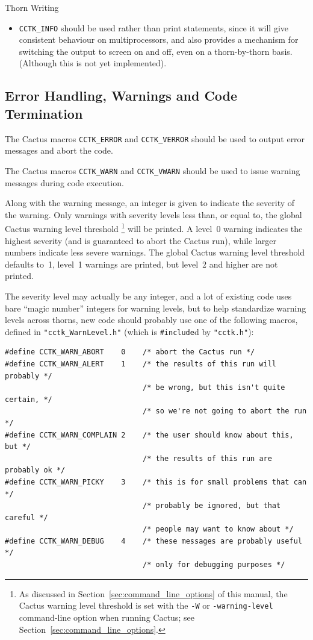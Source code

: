 \begin{cactuspart}{Thorn Writing}
\begin{itemize}
\item{} \texttt{CCTK\_INFO} should be used rather than print statements,
       since it will give consistent behaviour on multiprocessors, and
       also provides a mechanism for switching the output to screen on
       and off, even on a thorn-by-thorn basis. (Although this is
       not yet implemented).
\end{itemize}


\subsection{Error Handling, Warnings and Code Termination}
\label{sec:erhawancote}
The Cactus macros \texttt{CCTK\_ERROR} and
\texttt{CCTK\_VERROR} should be used to output error messages
and abort the code.

The Cactus macros \texttt{CCTK\_WARN} and
\texttt{CCTK\_VWARN} should be used to issue warning messages
during code execution.

Along with the warning message, an integer is given to indicate the
severity of the warning.  Only warnings with severity levels less
than, or equal to, the global Cactus warning level threshold%
\footnote{%
         As discussed in Section~\ref{sec:command_line_options}
         of this manual, the Cactus warning level threshold is
         set with the \texttt{-W} or \texttt{-warning-level}
         command-line option when running Cactus; see
         Section~\ref{sec:command_line_options}.
         }%
{} will be printed.  A level~0 warning indicates the highest severity
(and is guaranteed to abort the Cactus run), while larger numbers
indicate less severe warnings.  The global Cactus warning level threshold
defaults to~1, \ie{} level~1 warnings are printed, but level~2 and higher
are not printed.

The severity level may actually be any integer, and a lot of existing
code uses bare ``magic number'' integers for warning levels, but to
help standardize warning levels across thorns, new code should probably
use one of the following macros, defined in \verb|"cctk_WarnLevel.h"|
(which is \verb|#include|d by \verb|"cctk.h"|):
\begin{verbatim}
#define CCTK_WARN_ABORT    0    /* abort the Cactus run */
#define CCTK_WARN_ALERT    1    /* the results of this run will probably */
                                /* be wrong, but this isn't quite certain, */
                                /* so we're not going to abort the run */
#define CCTK_WARN_COMPLAIN 2    /* the user should know about this, but */
                                /* the results of this run are probably ok */
#define CCTK_WARN_PICKY    3    /* this is for small problems that can */
                                /* probably be ignored, but that careful */
                                /* people may want to know about */
#define CCTK_WARN_DEBUG    4    /* these messages are probably useful */
                                /* only for debugging purposes */
\end{verbatim}


\end{cactuspart}
